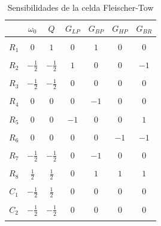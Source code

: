 \begin{table}[h!]
	\centering
	\begin{tabular}{c c c c c c c}
		& $\omega_0$ & $Q$ &$G_{LP}$ & $G_{BP}$& $G_{HP}$& $G_{BR}$\\
		\hline \\
		$R_1$ & $0$ & $1$ & $0$ & $1$ & $0$ & $0$\\ \\
		$R_2$ & $-\frac{1}{2}$ & $-\frac{1}{2}$ & $1$ & $0$ & $0$ & $-1$\\ \\
		$R_3$ & $-\frac{1}{2}$ & $-\frac{1}{2}$ & $0$ & $0$ & $0$ & $0$\\ \\
		$R_4$ & $0$ & $0$ & $0$ & $-1$ & $0$ & $0$\\ \\
		$R_5$ & $0$ & $0$ & $-1$ & $0$ & $0$ & $1$\\ \\
		$R_6$ & $0$ & $0$ & $0$ & $0$ & $-1$ & $-1$\\ \\
		$R_7$ & $-\frac{1}{2}$ & $-\frac{1}{2}$ & $0$ & $-1$ & $0$ & $0$\\ \\
		$R_8$ & $\frac{1}{2}$ & $\frac{1}{2}$ & $0$ & $1$ & $1$ & $1$\\ \\
		$C_1$ & $-\frac{1}{2}$ & $\frac{1}{2}$ & $0$ & $0$ & $0$ & $0$\\ \\
		$C_2$ & $-\frac{1}{2}$ & $-\frac{1}{2}$ & $0$ & $0$ & $0$ & $0$\\ \\
		\hline
	\end{tabular}
	\caption{Sensibilidades de la celda Fleischer-Tow}
	\label{sens_am}
\end{table}